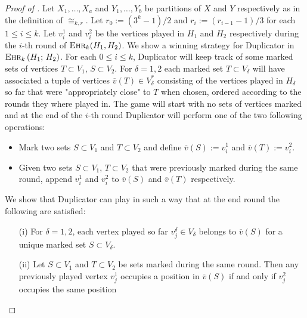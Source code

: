 \documentclass[12pt,notitlepage,a4paper]{article}
\theoremstyle{definition}
\newcommand{\ehr}{\textsc{Ehr}}
\begin{document}
\begin{proof}[Proof of ]
	Let $X_1,\dots,X_a$ and 
	$Y_1,\dots,Y_b$ be partitions of 
	$X$ and $Y$ respectively
	as in the definition of $\cong_{k,r}$.
	Let $r_0:=(3^k-1)/2$ and $r_i:=(r_{i-1}-1)/3$ for each
	$1\leq i \leq k$. 
	Let $v^1_i$ and $v^2_i$ be the vertices played
	in $H_1$ and $H_2$ respectively during the $i$-th
	round of $\ehr_k(H_1,H_2)$. 
	We show a winning strategy for Duplicator
	in $\ehr_{k}\left(H_1;\, H_2\right)$. For each $0\leq i \leq k$,
	Duplicator will	keep track of some marked sets 
	of vertices $T\subset V_1$, $S\subset V_2$. 
	For $\delta=1,2$ each marked set
	$T\subset V_\delta$ will have associated a tuple
	of vertices $\overline{v}(T)\in V_\delta^*$ consisting
	of the vertices played in $H_\delta$ so far that were 
	"appropriately close" to $T$ when chosen,  ordered according
	to the rounds they where played in.
	The game will start with no sets of vertices marked and 
	at the end of the $i$-th
	round Duplicator will perform one of the two
	following operations:
	\begin{itemize}
	\item Mark two sets $S\subset V_1$ and $T\subset V_2$ and
	define $\overline{v}(S):=v^1_i$ and $\overline{v}(T):=v^2_i$.
	\item Given two sets $S\subset V_1$, $T\subset V_2$ that were 
	previously marked during the same round, append $v^1_i$
	and $v^2_i$ to $\overline{v}(S)$ and $\overline{v}(T)$ 
	respectively. 
	\end{itemize}
	We show that Duplicator can play in such a way that at the
	end round the following are satisfied:
	\begin{itemize}
		\item[(i)] For $\delta=1,2$, each vertex played
		so far $v^\delta_j\in V_\delta$ belongs to 
		$\overline{v}(S)$ for a	 unique marked set 
		$S\subset V_\delta$.
		\item[(ii)] Let $S\subset V_1$ and $T\subset V_2$ be sets
		marked during the same round. Then any previously played
		vertex $v^1_j$ occupies a position in $\overline{v}(S)$
		if and only if $v^2_j$ occupies the same position 

\end{itemize}
\end{proof}
\end{document}

